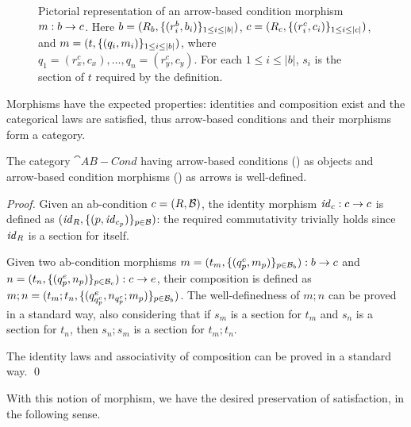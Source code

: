 %
\begin{figure}
  \centering
  
  \caption{Pictorial representation of an arrow-based condition morphism $m:b\rightarrow c$. Here $b=(R_b, \{{(r^b_i,b_i)}\}_{1\leq i\leq |b|})$, $c=(R_c, \{{(r^c_i,c_i)}\}_{1\leq i\leq |c|})$, and     
  $m = (t,\{{(q_i,m_i)}\}_{1\leq i \leq |b|})$, where $q_1 = (r^c_x,c_x), \ldots,q_n = (r^c_y,c_y)$. For each $1 \leq i \leq |b|$, $s_i$ is the section of $t$ required by the definition.}
\end{figure}

\medskip\noindent Morphisms have the expected properties: identities and composition exist and the categorical laws are satisfied, thus arrow-based conditions and their morphisms form a category.
%

\begin{proposition}
  The category $\cat{AB-Cond}$ having arrow-based conditions () as objects and arrow-based condition morphisms () as arrows is well-defined.
\end{proposition}
 
\begin{proof}
  Given an ab-condition $c=(R,\mathcal{B})$, the identity morphism $\mathit{id}_c:c\rightarrow c$ is defined as $(\mathit{id}_R,\{{(p,\mathit{id}_{c_p})}\}_{p\in \mathcal{B}})$: the required commutativity trivially holds since $\mathit{id}_R$ is a section for itself.
  
Given two ab-condition morphisms $m= (t_m,\{{(q^c_p,m_p)}\}_{p\in \mathcal{B}_b}):b\rightarrow c$ and $n = (t_n,\{{(q^e_p,n_p)}\}_{p\in \mathcal{B}_c}):c\rightarrow e$, their composition is defined as $m;n=(t_m;t_n,\{{(q^e_{q^c_p},n_{q^c_p};m_p)}\}_{p\in \mathcal{B}_b})$.
The well-definedness of $m;n$ can be proved in a standard way, also considering that if $s_m$ is a section for $t_m$ and $s_n$ is a section for $t_n$, then $s_n;s_m$ is a section for $t_m;t_n$.

The identity laws and associativity of composition can be proved in a standard way. \qed
\end{proof}
%
With this notion of morphism, we have the desired preservation of satisfaction, in the following sense.

